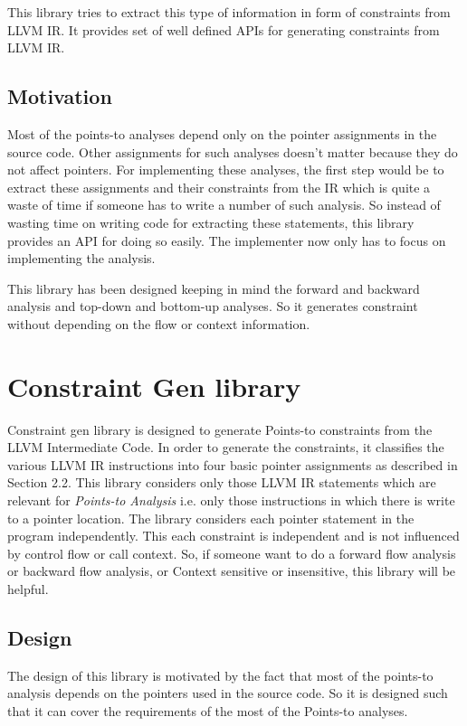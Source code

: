 \documentclass[a4paper,12pt]{report}
\begin{document}
This library tries to extract this type of information in form of constraints 
from LLVM IR. It provides set of well defined APIs for generating constraints 
from LLVM IR.

\section{Motivation}
Most of the points-to analyses depend only on the pointer assignments in
the source code. Other assignments for such analyses doesn't matter because
they do not affect pointers. For implementing these analyses, the
first step would be to extract these assignments and their constraints from
the IR which is quite a waste of time if someone has to write a number of such analysis. So instead of
wasting time on writing code for extracting these statements, this library 
provides an API for doing so easily. The implementer now only has to focus on 
implementing the analysis.

This library has been designed keeping in mind the forward and backward
analysis and top-down and bottom-up analyses. So it generates constraint
without depending on the flow or context information.

\chapter{Constraint Gen library}

Constraint gen library is designed to generate Points-to constraints from the
LLVM Intermediate Code. In order to generate the constraints, it classifies the
various LLVM IR instructions into four basic pointer assignments as described 
in Section 2.2. This library considers only those LLVM IR statements which are
relevant for \textit{Points-to Analysis} i.e. only those instructions in which 
there is write to a pointer location. The library considers each pointer statement in the 
program independently. This each constraint is independent and is not 
influenced by control flow or call context. So, if someone want to do a 
forward flow analysis or backward flow analysis, or Context sensitive or 
insensitive, this library will be helpful.


\section{Design}
The design of this library is motivated by the fact that most of the points-to 
analysis depends on the pointers used in the source code. So it is designed 
such that it can cover the requirements of the most of the Points-to analyses.
\end{document}
